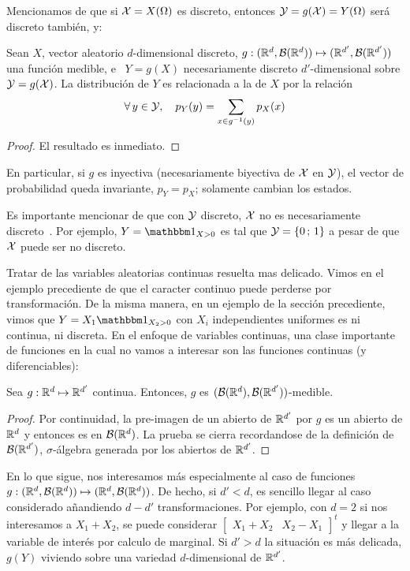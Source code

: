 Mencionamos  de que si  $\mathcal{X} =  X(\Omega)$ es  discreto, entonces  $\mathcal{Y} =  g(\mathcal{X}) =
Y(\Omega)$ ser\'a discreto tambi\'en, y:
%
\begin{teorema}
  Sean   $X$,   vector  aleatorio   $d$-dimensional   discreto,  $g:(\mathbb{R}^d   ,
  \mathcal{B}(\mathbb{R}^d)) \mapsto (\mathbb{R}^{d'} , \mathcal{B}(\mathbb{R}^{d'}))$ una funci\'on medible, e \
  $Y =  g(X)$ necesariamente discreto  $d'$-dimensional sobre $\mathcal{Y} =  g(\mathcal{X})$.  La
  distribuci\'on de $Y$ es relacionada a la de $X$ por la relaci\'on
  \[
  \forall \, y \in \mathcal{Y}, \quad p_Y(y) = \sum_{x \in g^{-1}(y)} p_X(x)
  \]
\end{teorema}
%
\begin{proof}
El resultado es inmediato.
\end{proof}
%
\noindent En particular,  si $g$ es inyectiva (necesariamente  biyectiva de $\mathcal{X}$
en $\mathcal{Y}$),  el vector  de probabilidad queda  invariante, $p_Y =  p_X$; solamente
cambian los estados.

Es  importante mencionar de  que con  $\mathcal{Y}$ discreto,  $\mathcal{X}$ no  es necesariamente
discreto~\cite{AthLah06}. Por ejemplo, $Y = \un_{X>0}$  es tal que $\mathcal{Y} = \{ 0 \,
; \, 1 \}$ a pesar de que $\mathcal{X}$ puede ser no discreto.

Tratar de las variables aleatorias  continuas resuelta mas delicado. Vimos en el
ejemplo   precediente  de   que  el   caracter  continuo   puede   perderse  por
transformaci\'on. De la misma manera, en un ejemplo de la secci\'on precediente,
vimos  que  $Y =  X_1  \un_{X_2>0}$ con  $X_i$  independientes  uniformes es  ni
continua,  ni  discreta.  En  el  enfoque  de  variables  continuas,  una  clase
importante  de funciones  en la  cual  no vamos  a interesar  son las  funciones
continuas (y diferenciables):
%
\begin{lema}
  Sea   $g:   \mathbb{R}^d   \mapsto   \mathbb{R}^{d'}$   continua.   Entonces,   $g$   es
  $(\mathcal{B}(\mathbb{R}^d),\mathcal{B}(\mathbb{R}^{d'}))$-medible.
\end{lema}
%
\begin{proof}
  Por continuidad,  la pre-imagen de  un abierto de  $\mathbb{R}^{d'}$ por $g$  es un
  abierto  de $\mathbb{R}^d$  y entonces  es en  $\mathcal{B}(\mathbb{R}^d)$. La  prueba  se cierra
  recordandose  de  la   definici\'on  de  $\mathcal{B}(\mathbb{R}^{d'})$,  $\sigma$-\'algebra
  generada por los abiertos de $\mathbb{R}^{d'}$.
\end{proof}

En lo  que sigue, nos interesamos  m\'as especialmente al caso  de funciones $g:
(\mathbb{R}^d ,  \mathcal{B}(\mathbb{R}^d)) \mapsto (\mathbb{R}^d ,  \mathcal{B}(\mathbb{R}^d))$.  De hecho,  si $d' <
d$,   es    sencillo   llegar   al   caso    considerado   a\~nandiendo   $d-d'$
transformaciones. Por ejemplo, con $d = 2$  si nos interesamos a $X_1 + X_2$, se
puede considerar $\begin{bmatrix} X_1 + X_2 & X_2 - X_1\end{bmatrix}^t$ y llegar
a la variable de  inter\'es por calculo de marginal. Si $d'  > d$ la situaci\'on
es  m\'as  delicada,  $g(Y)$  viviendo  sobre una  variedad  $d$-dimensional  de
$\mathbb{R}^{d'}$.

